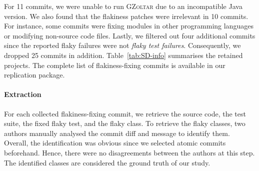 For 11 commits, we were unable to run \textsc{GZoltar} due to an incompatible Java version. We also found that the flakiness patches were irrelevant in 10 commits.
For instance, some commits were fixing modules in other programming languages or modifying non-source code files.
Lastly, we filtered out four additional commits since the reported flaky failures were not \textit{flaky test failures}.
Consequently, we dropped 25 commits in addition. Table~\ref{tab:SD-info} summarises the retained projects.
The complete list of flakiness-fixing commits is available in our replication package. 

\paragraph{Extraction}
For each collected flakiness-fixing commit, we retrieve the source code, the test suite, the fixed flaky test, and the flaky class. To retrieve the flaky classes, two authors manually analysed the commit diff and message to identify them.
Overall, the identification was obvious since we selected atomic commits beforehand.
Hence, there were no disagreements between the authors at this step.
The identified classes are considered the ground truth of our study. 

